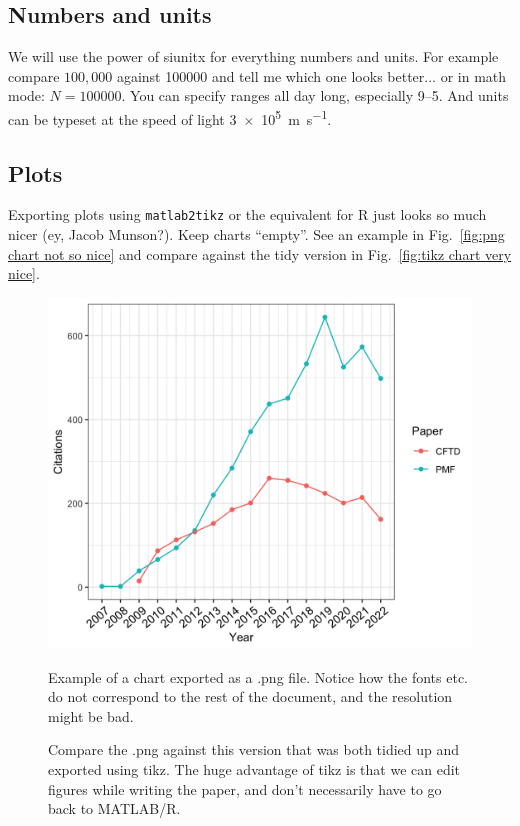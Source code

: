 \documentclass[11pt]{article}
\newcommand{\figref}[1]{Fig.~\ref{#1}}
\begin{document}
\subsection{Numbers and units}
We will use the power of siunitx for everything numbers and units. For example compare $100,000$ against \num{100000} and tell me which one looks better... or in math mode: $N = \num{100000}$. You can specify ranges all day long, especially \numrange{9}{5}. And units can be typeset at the speed of light \qty{3e5}{\meter\per\second}.

\subsection{Plots}
Exporting plots using \verb|matlab2tikz| or the equivalent for R just looks so much nicer (ey, Jacob Munson?). Keep charts ``empty''. See an example in \figref{fig:png chart not so nice} and compare against the tidy version in \figref{fig:tikz chart very nice}.

\begin{figure}
    \begin{minipage}[t]{.49\textwidth}    
    \centering
    \includegraphics[width=\textwidth]{figures/image.png}
        \caption{Example of a chart exported as a .png file. Notice how the fonts etc. do not correspond to the rest of the document, and the resolution might be bad.}
    \label{fig:png chart not so nice}
    \end{minipage}\hfill
    \begin{minipage}[t]{.49\textwidth}    
    \centering
    
    \caption{Compare the .png against this version that was both tidied up and exported using tikz. The huge advantage of tikz is that we can edit figures while writing the paper, and don't necessarily have to go back to MATLAB/R.}
    \label{fig:tikz chart very nice yeah}
    \end{minipage}
\end{figure}
\end{document}
